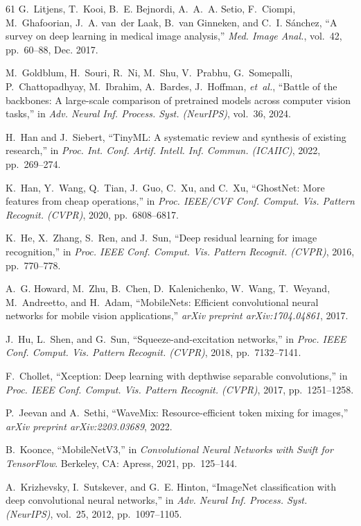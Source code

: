 \begin{thebibliography}{61}
G.~Litjens, T.~Kooi, B.~E. Bejnordi, A.~A.~A. Setio, F.~Ciompi, M.~Ghafoorian, J.~A. van~der Laak, B.~van Ginneken, and C.~I. S{\'a}nchez, ``A survey on deep learning in medical image analysis,'' \emph{Med. Image Anal.}, vol.~42, pp.~60--88, Dec. 2017. 

M.~Goldblum, H.~Souri, R.~Ni, M.~Shu, V.~Prabhu, G.~Somepalli, P.~Chattopadhyay, M.~Ibrahim, A.~Bardes, J.~Hoffman, \emph{et~al.}, ``Battle of the backbones: A large-scale comparison of pretrained models across computer vision tasks,'' in \emph{Adv. Neural Inf. Process. Syst. (NeurIPS)}, vol.~36, 2024.

H.~Han and J.~Siebert, ``TinyML: A systematic review and synthesis of existing research,'' in \emph{Proc. Int. Conf. Artif. Intell. Inf. Commun. (ICAIIC)}, 2022, pp.~269--274. 

K.~Han, Y.~Wang, Q.~Tian, J.~Guo, C.~Xu, and C.~Xu, ``GhostNet: More features from cheap operations,'' in \emph{Proc. IEEE/CVF Conf. Comput. Vis. Pattern Recognit. (CVPR)}, 2020, pp.~6808--6817.

K.~He, X.~Zhang, S.~Ren, and J.~Sun, ``Deep residual learning for image recognition,'' in \emph{Proc. IEEE Conf. Comput. Vis. Pattern Recognit. (CVPR)}, 2016, pp.~770--778.

A.~G. Howard, M.~Zhu, B.~Chen, D.~Kalenichenko, W.~Wang, T.~Weyand, M.~Andreetto, and H.~Adam, ``MobileNets: Efficient convolutional neural networks for mobile vision applications,'' \emph{arXiv preprint arXiv:1704.04861}, 2017.

J.~Hu, L.~Shen, and G.~Sun, ``Squeeze-and-excitation networks,'' in \emph{Proc. IEEE Conf. Comput. Vis. Pattern Recognit. (CVPR)}, 2018, pp.~7132--7141.

F.~Chollet, ``Xception: Deep learning with depthwise separable convolutions,'' in \emph{Proc. IEEE Conf. Comput. Vis. Pattern Recognit. (CVPR)}, 2017, pp.~1251--1258.

P.~Jeevan and A.~Sethi, ``WaveMix: Resource-efficient token mixing for images,'' \emph{arXiv preprint arXiv:2203.03689}, 2022.

B.~Koonce, ``MobileNetV3,'' in \emph{Convolutional Neural Networks with Swift for TensorFlow}. Berkeley, CA: Apress, 2021, pp.~125--144.

A.~Krizhevsky, I.~Sutskever, and G.~E. Hinton, ``ImageNet classification with deep convolutional neural networks,'' in \emph{Adv. Neural Inf. Process. Syst. (NeurIPS)}, vol.~25, 2012, pp.~1097--1105.


\end{thebibliography}

